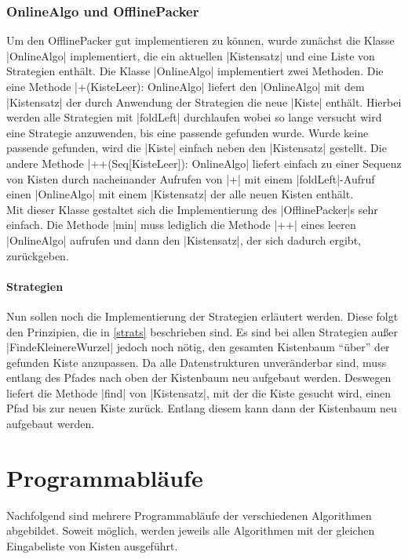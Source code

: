 \subsubsection{OnlineAlgo und OfflinePacker}
Um den OfflinePacker gut implementieren zu können, wurde zunächst die Klasse |OnlineAlgo| implementiert, die ein aktuellen |Kistensatz| und eine Liste von Strategien enthält.
Die Klasse |OnlineAlgo| implementiert zwei Methoden.
Die eine Methode |+(KisteLeer): OnlineAlgo| liefert den |OnlineAlgo| mit dem |Kistensatz| der durch Anwendung der Strategien die neue |Kiste| enthält.
Hierbei werden alle Strategien mit |foldLeft| durchlaufen wobei so lange versucht wird eine Strategie anzuwenden, bis eine passende gefunden wurde.
Wurde keine passende gefunden, wird die |Kiste| einfach neben den |Kistensatz| gestellt.
Die andere Methode |++(Seq[KisteLeer]): OnlineAlgo| liefert einfach zu einer Sequenz von Kisten durch nacheinander Aufrufen von |+| mit einem |foldLeft|-Aufruf einen
|OnlineAlgo| mit einem |Kistensatz| der alle neuen Kisten enthält.\\
Mit dieser Klasse gestaltet sich die Implementierung des |OfflinePacker|s sehr einfach.
Die Methode |min| muss lediglich die Methode |++| eines leeren |OnlineAlgo| aufrufen und dann den |Kistensatz|, der sich dadurch ergibt, zurückgeben.
\paragraph{Strategien}
Nun sollen noch die Implementierung der Strategien erläutert werden.
Diese folgt den Prinzipien, die in \ref{strats} beschrieben sind.
Es sind bei allen Strategien außer |FindeKleinereWurzel| jedoch noch nötig, den gesamten Kistenbaum ``über'' der gefunden Kiste anzupassen.
Da alle Datenstrukturen unveränderbar sind, muss entlang des Pfades nach oben der Kistenbaum neu aufgebaut werden.
Deswegen liefert die Methode |find| von |Kistensatz|, mit der die Kiste gesucht wird, einen Pfad bis zur neuen Kiste zurück.
Entlang diesem kann dann der Kistenbaum neu aufgebaut werden.

\clearpage

\section{Programmabläufe}
Nachfolgend sind mehrere Programmabläufe der verschiedenen Algorithmen abgebildet.
Soweit möglich, werden jeweils alle Algorithmen mit der gleichen Eingabeliste von Kisten ausgeführt.
